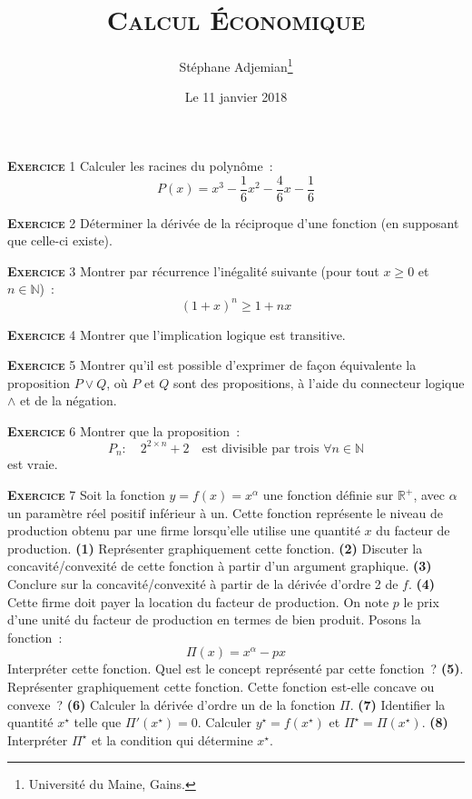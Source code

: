 \documentclass[10pt,a4paper,notitlepage,onecolumn]{article}
\newcommand{\exercice}[1]{\textsc{\textbf{Exercice}} #1}
\begin{document}
\title{\textsc{Calcul Économique}}
\author{Stéphane Adjemian\thanks{Université du Maine, Gains.}}
\date{Le 11 janvier 2018}

\maketitle
\thispagestyle{empty}

\exercice{1} Calculer les racines du polynôme :
\[
P(x) = x^3 - \frac{1}{6}x^2 - \frac{4}{6}x - \frac{1}{6}
\]    

\bigskip

\exercice{2} Déterminer la dérivée de la réciproque d'une fonction (en supposant que celle-ci existe).

\bigskip

\exercice{3} Montrer par récurrence l'inégalité suivante (pour tout $x\geq 0$ et $n\in\mathbb N$) :
\[
(1+x)^n \geq 1+nx
\]

\bigskip

\exercice{4} Montrer que l'implication logique est transitive.

\bigskip

\exercice{5} Montrer qu'il est possible d'exprimer de façon équivalente la proposition $P \lor Q$, où $P$ et $Q$
sont des propositions, à l'aide du connecteur logique $\land$ et de la négation.

\bigskip

\exercice{6} Montrer que la proposition :
\[
P_n: \quad 2^{2\times n}+2 \quad \text{est divisible par trois }\forall n\in\mathbb N 
\]
est vraie.

\bigskip

\exercice{7} Soit la fonction $y = f(x) = x^{\alpha}$ une fonction définie
sur $\mathbb R^+$, avec $\alpha$ un paramètre réel positif inférieur à
un. Cette fonction représente le niveau de production
obtenu par une firme lorsqu'elle utilise une quantité $x$ du facteur
de production. \textbf{(1)} Représenter graphiquement cette
fonction. \textbf{(2)} Discuter la concavité/convexité de cette
fonction à partir d'un argument graphique. \textbf{(3)} Conclure sur
la concavité/convexité à partir de la dérivée d'ordre 2 de
$f$. \textbf{(4)} Cette firme doit payer la location du facteur de
production. On note $p$ le prix d'une unité du facteur de
production en termes de bien produit. Posons la fonction :
\[
\Pi(x) = x^{\alpha} - p x
\]
Interpréter cette fonction. Quel est le concept représenté par cette
fonction ? \textbf{(5)}. Représenter graphiquement cette fonction. Cette fonction est-elle concave ou convexe ?
\textbf{(6)} Calculer la dérivée d'ordre un de la fonction
$\Pi$. \textbf{(7)} Identifier la quantité $x^{\star}$ telle que
$\Pi'(x^{\star}) = 0$. Calculer $y^{\star}=f(x^{\star})$ et
$\Pi^{\star} = \Pi(x^{\star})$. \textbf{(8)} Interpréter $\Pi^{\star}$
et la condition qui détermine $x^{\star}$.
\end{document}
